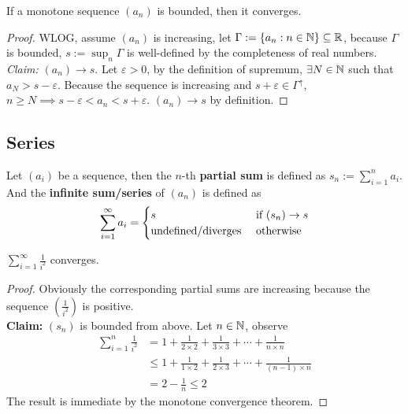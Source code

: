 \documentclass[11pt]{article}
\begin{document}
	\begin{theorem}
		If a monotone sequence $(a_n)$ is bounded, then it converges.
	\end{theorem}
	
	\begin{proof}
		WLOG, assume $(a_n)$ is increasing, let $\Gamma := \{a_n: n \in \mathbb{N}\} \subseteq \mathbb{R}$, because $\Gamma$ is bounded, $s := \sup_n \Gamma$ is well-defined by the completeness of real numbers.\\
		\emph{Claim:} $(a_n) \to s$. Let $\varepsilon > 0$, by the definition of supremum, $\exists N \in \mathbb{N}$ such that $a_N > s - \varepsilon$. Because the sequence is increasing and $s + \varepsilon \in \Gamma^\uparrow$, $n \geq N \implies s - \varepsilon < a_n  < s + \varepsilon$. $(a_n) \to s$ by definition.
	\end{proof}
	
	\subsection{Series}
	\begin{definition}
		Let $(a_i)$ be a sequence, then the $n$-th \textbf{partial sum} is defined as $s_n := \sum_{i=1}^n a_i$. And the \textbf{infinite sum/series} of $(a_n)$ is defined as 
		\begin{align}
			\sum_{i=1}^\infty a_i
			= \begin{cases}
				s &\text{{ if }} (s_n) \to s \\
				\text{{undefined/diverges}} &\text{{ otherwise}}
			\end{cases}
		\end{align}
	\end{definition}
	
	\begin{example}
		$\sum_{i=1}^\infty \frac{1}{i^2}$ converges.
	\end{example}
	
	\begin{proof}
		Obviously the corresponding partial sums are increasing because the sequence $(\frac{1}{i^2})$ is positive. \\
		\textbf{Claim:} $(s_n)$ is bounded from above. Let $n \in \mathbb{N}$, observe
		\begin{align}
			\sum_{i=1}^n \frac{1}{i^2} &= 1 + \frac{1}{2 \times 2} + \frac{1}{3 \times 3} + \cdots + \frac{1}{n \times n} \\
			&\leq 1 + \frac{1}{1 \times 2} + \frac{1}{2 \times 3} + \cdots + \frac{1}{(n-1) \times n} \\
			&= 2 - \frac{1}{n} \leq 2
		\end{align}
		The result is immediate by the monotone convergence theorem.
	\end{proof}
	
\end{document}

